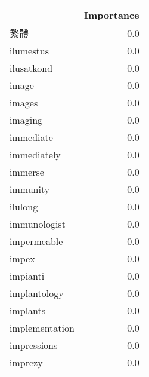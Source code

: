 \begin{tabular}{lr}
\toprule
{} &  Importance \\
\midrule
繁體             &         0.0 \\
ilumestus      &         0.0 \\
ilusatkond     &         0.0 \\
image          &         0.0 \\
images         &         0.0 \\
imaging        &         0.0 \\
immediate      &         0.0 \\
immediately    &         0.0 \\
immerse        &         0.0 \\
immunity       &         0.0 \\
ilulong        &         0.0 \\
immunologist   &         0.0 \\
impermeable    &         0.0 \\
impex          &         0.0 \\
impianti       &         0.0 \\
implantology   &         0.0 \\
implants       &         0.0 \\
implementation &         0.0 \\
impressions    &         0.0 \\
imprezy        &         0.0 \\
\bottomrule
\end{tabular}
